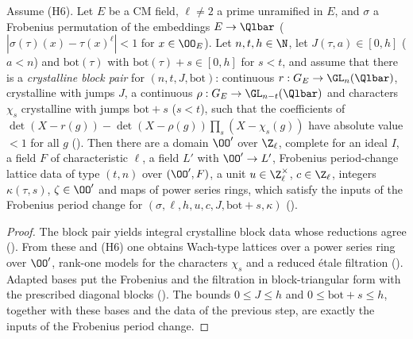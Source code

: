 \begin{proposition}\label{pf:onto2:wach}
Assume (H6). Let $E$ be a CM field, $\ell\ne2$ a prime unramified in $E$, and $\sigma$ a Frobenius permutation of the embeddings
$E\to\Qlbar$ ($|\sigma(\tau)(x)-\tau(x)^\ell|<1$ for $x\in\OO_E$). Let $n,t,h\in\N$, let $J(\tau,a)\in[0,h]$ ($a<n$) and $\mathrm{bot}(\tau)$
with $\mathrm{bot}(\tau)+s\in[0,h]$ for $s<t$, and assume that there is a \emph{crystalline block pair} for $(n,t,J,\mathrm{bot})$:
continuous $r:G_E\to\GL_n(\Qlbar)$, crystalline with jumps $J$, a continuous $\rho:G_E\to\GL_{n-t}(\Qlbar)$ and characters $\chi_s$
crystalline with jumps $\mathrm{bot}+s$ ($s<t$), such that the coefficients of $\det(X-r(g))-\det(X-\rho(g))\prod_s(X-\chi_s(g))$ have
absolute value $<1$ for all $g$ (). Then there are a domain $\OO'$ over $\Z_\ell$, complete
for an ideal $I$, a field $F$ of characteristic $\ell$, a field $L'$ with $\OO'\to L'$, Frobenius period-change lattice data of
type $(t,n)$ over $(\OO',F)$, a unit $u\in\Z_\ell^\times$, $c\in\Z_\ell$, integers $\kappa(\tau,s)$, $\zeta\in\OO'$ and maps of power series
rings, which satisfy the inputs of the Frobenius period change for $(\sigma,\ell,h,u,c,J,\mathrm{bot}+s,\kappa)$
().
\end{proposition}

\begin{proof}
The block pair yields integral crystalline block data whose reductions agree
(). From these and (H6) one obtains Wach-type lattices over a power series ring over $\OO'$, rank-one models for the characters
$\chi_s$ and a reduced \'etale filtration (). Adapted bases put the Frobenius and the filtration in block-triangular form
with the prescribed diagonal blocks (). The bounds
$0\le J\le h$ and $0\le\mathrm{bot}+s\le h$, together with these bases and the data of the previous step, are exactly the inputs of the
Frobenius period change.
\end{proof}

